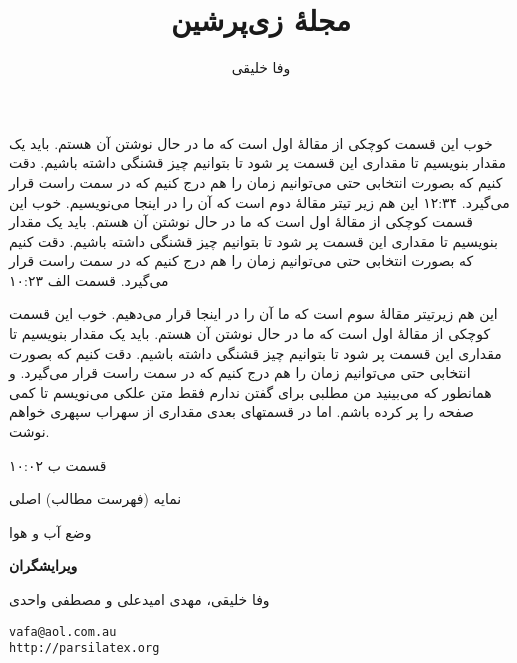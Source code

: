 \documentclass[12pt,twoside]{xepersian-magazine}
\title{مجلهٔ زی‌پرشین}
\author{وفا خلیقی}
\begin{document}
\begin{frontpage}
						{خوب این قسمت کوچکی از مقالهٔ اول است که ما در حال نوشتن آن هستم. باید یک مقدار بنویسیم تا مقداری این قسمت پر شود تا بتوانیم چیز قشنگی داشته باشیم. دقت کنیم که بصورت انتخابی حتی می‌توانیم زمان را هم درج کنیم که در سمت راست قرار می‌گیرد.}%
						{۱۲:۳۴}
%
						{این هم زیر تیتر مقالهٔ دوم است که آن را در اینجا می‌نویسیم.}%
						{خوب این قسمت کوچکی از مقالهٔ اول است که ما در حال نوشتن آن هستم. باید یک مقدار بنویسیم تا مقداری این قسمت پر شود تا بتوانیم چیز قشنگی داشته باشیم. دقت کنیم که بصورت انتخابی حتی می‌توانیم زمان را هم درج کنیم که در سمت راست قرار می‌گیرد.}%
						{قسمت الف}%
						{۱۰:۲۳}

%
					{این هم زیرتیتر مقالهٔ سوم است که ما آن را در اینجا قرار می‌دهیم.}%
					{خوب این قسمت کوچکی از مقالهٔ اول است که ما در حال نوشتن آن هستم. باید یک مقدار بنویسیم تا مقداری این قسمت پر شود تا بتوانیم چیز قشنگی داشته باشیم. دقت کنیم که بصورت انتخابی حتی می‌توانیم زمان را هم درج کنیم که در سمت راست قرار می‌گیرد. و همانطور که می‌بینید من مطلبی برای گفتن ندارم فقط متن علکی می‌نویسم تا کمی صفحه را پر کرده باشم. اما در قسمتهای بعدی مقداری از سهراب سپهری خواهم نوشت.}%
					
					{قسمت ب}%
					{۱۰:۰۲}

\begin{indexblock}{نمایه (فهرست مطالب) اصلی}



\end{indexblock}

\begin{weatherblock}{وضع آب و هوا}
\end{weatherblock}


\begin{authorblock}
\textbf{ویرایشگران}

وفا خلیقی، مهدی امیدعلی و مصطفی واحدی

\texttt{vafa@aol.com.au\\[5pt]
http://parsilatex.org}\\
\end{authorblock}
\end{frontpage}
\end{document}
